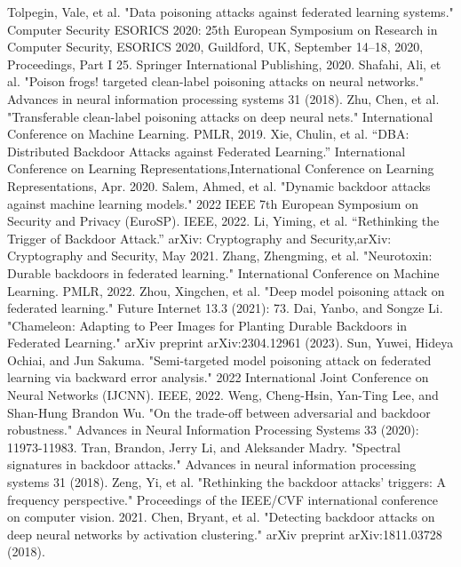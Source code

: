 \documentclass[conference]{IEEEtran}
\begin{document}
\begin{thebibliography}{00}
     Tolpegin, Vale, et al. "Data poisoning attacks against federated learning systems." Computer Security ESORICS 2020: 25th European Symposium on Research in Computer Security, ESORICS 2020, Guildford, UK, September 14–18, 2020, Proceedings, Part I 25. Springer International Publishing, 2020.
     Shafahi, Ali, et al. "Poison frogs! targeted clean-label poisoning attacks on neural networks." Advances in neural information processing systems 31 (2018).
     Zhu, Chen, et al. "Transferable clean-label poisoning attacks on deep neural nets." International Conference on Machine Learning. PMLR, 2019.
     Xie, Chulin, et al. “DBA: Distributed Backdoor Attacks against Federated Learning.” International Conference on Learning Representations,International Conference on Learning Representations, Apr. 2020.
     Salem, Ahmed, et al. "Dynamic backdoor attacks against machine learning models." 2022 IEEE 7th European Symposium on Security and Privacy (EuroSP). IEEE, 2022.
     Li, Yiming, et al. “Rethinking the Trigger of Backdoor Attack.” arXiv: Cryptography and Security,arXiv: Cryptography and Security, May 2021.
     Zhang, Zhengming, et al. "Neurotoxin: Durable backdoors in federated learning." International Conference on Machine Learning. PMLR, 2022.
     Zhou, Xingchen, et al. "Deep model poisoning attack on federated learning." Future Internet 13.3 (2021): 73.
     Dai, Yanbo, and Songze Li. "Chameleon: Adapting to Peer Images for Planting Durable Backdoors in Federated Learning." arXiv preprint arXiv:2304.12961 (2023).
     Sun, Yuwei, Hideya Ochiai, and Jun Sakuma. "Semi-targeted model poisoning attack on federated learning via backward error analysis." 2022 International Joint Conference on Neural Networks (IJCNN). IEEE, 2022.
     Weng, Cheng-Hsin, Yan-Ting Lee, and Shan-Hung Brandon Wu. "On the trade-off between adversarial and backdoor robustness." Advances in Neural Information Processing Systems 33 (2020): 11973-11983.
     Tran, Brandon, Jerry Li, and Aleksander Madry. "Spectral signatures in backdoor attacks." Advances in neural information processing systems 31 (2018).
     Zeng, Yi, et al. "Rethinking the backdoor attacks' triggers: A frequency perspective." Proceedings of the IEEE/CVF international conference on computer vision. 2021.
     Chen, Bryant, et al. "Detecting backdoor attacks on deep neural networks by activation clustering." arXiv preprint arXiv:1811.03728 (2018).

\end{thebibliography}
\end{document}
